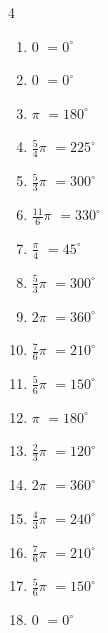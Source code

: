 \begin{multicols}{4}
\begin{enumerate}
  \item $\displaystyle 0$
        $\displaystyle =0^{\circ}$

  \item $\displaystyle 0$
        $\displaystyle =0^{\circ}$

  \item $\displaystyle \pi$
        $\displaystyle =180^{\circ}$

  \item $\displaystyle \frac{5}{4}\pi$
        $\displaystyle =225^{\circ}$

  \item $\displaystyle \frac{5}{3}\pi$
        $\displaystyle =300^{\circ}$

  \item $\displaystyle \frac{11}{6}\pi$
        $\displaystyle =330^{\circ}$

  \item $\displaystyle \frac{\pi}{4}$
        $\displaystyle =45^{\circ}$

  \item $\displaystyle \frac{5}{3}\pi$
        $\displaystyle =300^{\circ}$

  \item $\displaystyle 2\pi$
        $\displaystyle =360^{\circ}$

  \item $\displaystyle \frac{7}{6}\pi$
        $\displaystyle =210^{\circ}$

  \item $\displaystyle \frac{5}{6}\pi$
        $\displaystyle =150^{\circ}$

  \item $\displaystyle \pi$
        $\displaystyle =180^{\circ}$

  \item $\displaystyle \frac{2}{3}\pi$
        $\displaystyle =120^{\circ}$

  \item $\displaystyle 2\pi$
        $\displaystyle =360^{\circ}$

  \item $\displaystyle \frac{4}{3}\pi$
        $\displaystyle =240^{\circ}$

  \item $\displaystyle \frac{7}{6}\pi$
        $\displaystyle =210^{\circ}$

  \item $\displaystyle \frac{5}{6}\pi$
        $\displaystyle =150^{\circ}$

  \item $\displaystyle 0$
        $\displaystyle =0^{\circ}$


\end{enumerate}
\end{multicols}
